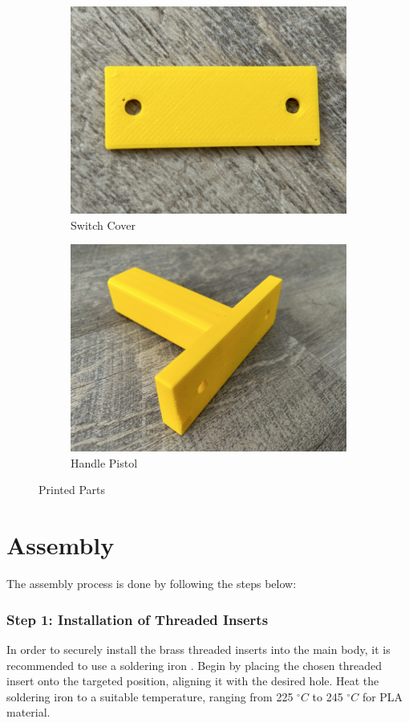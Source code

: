 \begin{figure}[!ht]
\begin{subfigure}[c]{0.45\textwidth}
        \label{fig:printed_battery_cover}
    \end{subfigure}
    \begin{subfigure}[c]{0.45\textwidth}
        \begin{minipage}{\textwidth}
            \centering
            \includegraphics[height=4 cm]{texs/Part1/chapter5/image/res_switch.jpg}
        \end{minipage}
        \caption{Switch Cover}
        \label{fig:printed_switch_cover}
    \end{subfigure}
    \begin{subfigure}[c]{0.45\textwidth}
        \begin{minipage}{\textwidth}
            \centering
            \includegraphics[height=4 cm]{texs/Part1/chapter5/image/res_grip.jpg}
        \end{minipage}
        \caption{Handle Pistol}
        \label{fig:printed_handle_pistol}
    \end{subfigure}
    \caption{Printed Parts}
    \label{fig:printedparts}
\end{figure}

\section{Assembly}
\label{sec:assembly}

The assembly process is done by following the steps below:

\subsubsection{Step 1: Installation of Threaded Inserts}
In order to securely install the brass threaded inserts into the main body, it is recommended to use a soldering iron \cite{Hermann23}. Begin by placing the chosen threaded insert onto the targeted position, aligning it with the desired hole. Heat the soldering iron to a suitable temperature, ranging from 225 $^{\circ}C$ to 245 $^{\circ}C$ for PLA material.

